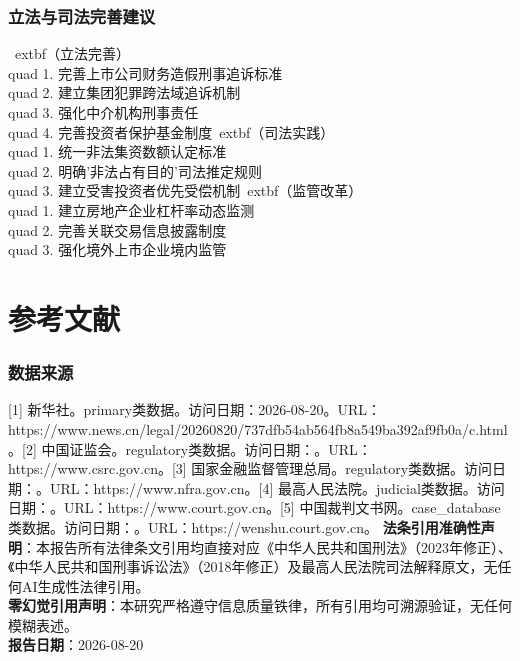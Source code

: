 \documentclass[11pt,a4paper,oneside]{article}
\begin{document}
\section{立法与司法完善建议}
\	extbf{（立法完善）}\\quad 1. 完善上市公司财务造假刑事追诉标准\\quad 2. 建立集团犯罪跨法域追诉机制\\quad 3. 强化中介机构刑事责任\\quad 4. 完善投资者保护基金制度\	extbf{（司法实践）}\\quad 1. 统一非法集资数额认定标准\\quad 2. 明确'非法占有目的'司法推定规则\\quad 3. 建立受害投资者优先受偿机制\	extbf{（监管改革）}\\quad 1. 建立房地产企业杠杆率动态监测\\quad 2. 完善关联交易信息披露制度\\quad 3. 强化境外上市企业境内监管\part{参考文献}
\section{数据来源}
[1] 新华社。primary类数据。访问日期：2026-08-20。URL：https://www.news.cn/legal/20260820/737dfb54ab564fb8a549ba392af9fb0a/c.html。[2] 中国证监会。regulatory类数据。访问日期：。URL：https://www.csrc.gov.cn。[3] 国家金融监督管理总局。regulatory类数据。访问日期：。URL：https://www.nfra.gov.cn。[4] 最高人民法院。judicial类数据。访问日期：。URL：https://www.court.gov.cn。[5] 中国裁判文书网。case_database类数据。访问日期：。URL：https://wenshu.court.gov.cn。\vfill
\noindent\textbf{法条引用准确性声明}：本报告所有法律条文引用均直接对应《中华人民共和国刑法》（2023年修正）、《中华人民共和国刑事诉讼法》（2018年修正）及最高人民法院司法解释原文，无任何AI生成性法律引用。\\\textbf{零幻觉引用声明}：本研究严格遵守信息质量铁律，所有引用均可溯源验证，无任何模糊表述。\\\textbf{报告日期}：2026-08-20
\end{document}
